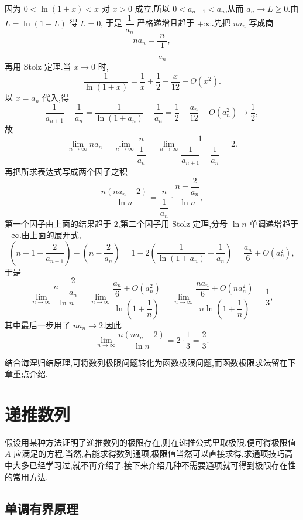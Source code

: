 \begin{solution}
  因为 $0<\ln(1+x)<x$ 对 $x>0$ 成立,所以
  $0<a_{n+1}<a_n$,从而 $a_n\to L\geq0$.由 $L=\ln(1+L)$ 得 $L=0$,
  于是 $\dfrac{1}{a_n}$ 严格递增且趋于 $+\infty$.先把 $na_n$ 写成商
  \[
    na_n=\dfrac{n}{\dfrac{1}{a_n}},
  \]
  再用 Stolz 定理.当 $x\to0$ 时,
  \[
    \dfrac{1}{\ln(1+x)}
    =\dfrac{1}{x}+\dfrac{1}{2}-\dfrac{x}{12}+O(x^2).
  \]
  以 $x=a_n$ 代入,得
  \[
    \dfrac{1}{a_{n+1}}-\dfrac{1}{a_n}
    =\dfrac{1}{\ln(1+a_n)}-\dfrac{1}{a_n}
    =\dfrac{1}{2}-\dfrac{a_n}{12}+O(a_n^2)\longrightarrow\dfrac{1}{2},
  \]
  故
  \[
    \displaystyle\lim\limits_{n\to\infty}na_n
    =\lim\limits_{n\to\infty}\dfrac{n}{\dfrac{1}{a_n}}
    =\lim\limits_{n\to\infty}
    \dfrac{1}{\dfrac{1}{a_{n+1}}-\dfrac{1}{a_n}}
    =2.
  \]
  再把所求表达式写成两个因子之积
  \[
    \dfrac{n(na_n-2)}{\ln n}
    =\dfrac{n}{\dfrac{1}{a_n}}\cdot
    \dfrac{n-\dfrac{2}{a_n}}{\ln n},
  \]
  第一个因子由上面的结果趋于 $2$,第二个因子用 Stolz 定理,分母 $\ln n$
  单调递增趋于 $+\infty$.由上面的展开式,
  \[
    \left(n+1-\dfrac{2}{a_{n+1}}\right)-\left(n-\dfrac{2}{a_n}\right)
    =1-2\left(\dfrac{1}{\ln(1+a_n)}-\dfrac{1}{a_n}\right)
    =\dfrac{a_n}{6}+O(a_n^2),
  \]
  于是
  \[
    \displaystyle\lim\limits_{n\to\infty}\dfrac{n-\dfrac{2}{a_n}}{\ln n}
    =\lim\limits_{n\to\infty}
    \dfrac{\dfrac{a_n}{6}+O(a_n^2)}{\ln\left(1+\dfrac{1}{n}\right)}
    =\lim\limits_{n\to\infty}
    \dfrac{\dfrac{na_n}{6}+O(na_n^2)}
    {n\ln\left(1+\dfrac{1}{n}\right)}
    =\dfrac{1}{3},
  \]
  其中最后一步用了 $na_n\to2$.因此
  \[
    \displaystyle\lim\limits_{n\to\infty}\dfrac{n(na_n-2)}{\ln n}
    =2\cdot\dfrac{1}{3}=\dfrac{2}{3}.
  \]
\end{solution}




结合海涅归结原理,可将数列极限问题转化为函数极限问题,而函数极限求法留在下章重点介绍.


\newpage

\section{递推数列}

假设用某种方法证明了递推数列的极限存在,则在递推公式里取极限,便可得极限值 $A$ 应满足的方程.当然,若能求得数列通项,极限值当然可以直接求得,求通项技巧高中大多已经学习过,就不再介绍了,接下来介绍几种不需要通项就可得到极限存在性的常用方法.



\subsection{单调有界原理}

